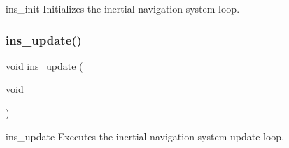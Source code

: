 ins\+\_\+init Initializes the inertial navigation system loop. \mbox{\label{ins_8c_a74e9285079c0cacb835d7dc6a686be18}} 
\subsubsection{ins\+\_\+update()}
{\footnotesize\ttfamily void ins\+\_\+update (\begin{DoxyParamCaption}\item[{void}]{ }\end{DoxyParamCaption})}

ins\+\_\+update Executes the inertial navigation system update loop. 